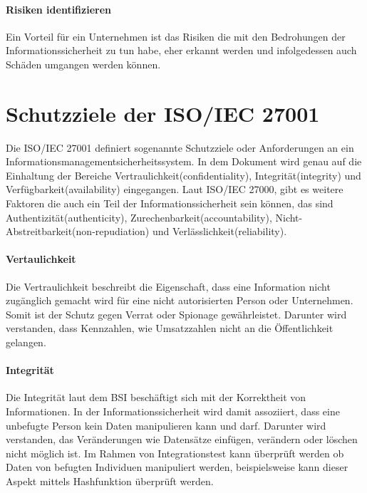 \paragraph{Risiken identifizieren}
Ein Vorteil für ein Unternehmen ist das Risiken die mit den Bedrohungen der Informationssicherheit zu tun habe, eher erkannt werden und infolgedessen auch Schäden umgangen werden können.

\section{Schutzziele der ISO/IEC 27001}
Die ISO/IEC 27001 definiert sogenannte Schutzziele oder Anforderungen an ein Informationsmanagementsicherheitssystem. In dem Dokument wird genau auf die Einhaltung der Bereiche Vertraulichkeit(confidentiality), Integrität(integrity) und Verfügbarkeit(availability) eingegangen. Laut ISO/IEC 27000, gibt es weitere Faktoren die auch ein Teil der Informationssicherheit sein können, das sind Authentizität(authenticity), Zurechenbarkeit(accountability), Nicht-Abstreitbarkeit(non-repudiation) und Verlässlichkeit(reliability).

\paragraph{Vertaulichkeit}
Die Vertraulichkeit beschreibt die Eigenschaft, dass eine Information nicht zugänglich gemacht wird für eine nicht autorisierten Person oder Unternehmen. Somit ist der Schutz gegen Verrat oder Spionage gewährleistet. Darunter wird verstanden, dass Kennzahlen, wie Umsatzzahlen nicht an die Öffentlichkeit gelangen. 


\paragraph{Integrität}
Die Integrität laut dem BSI beschäftigt sich mit der Korrektheit von Informationen. In der Informationssicherheit wird damit assoziiert, dass eine unbefugte Person kein Daten manipulieren kann und darf. Darunter wird verstanden, das Veränderungen wie Datensätze einfügen, verändern oder löschen nicht möglich ist.
Im Rahmen von Integrationstest kann überprüft werden ob Daten von befugten Individuen manipuliert werden, beispielsweise kann dieser Aspekt mittels Hashfunktion überprüft werden.


